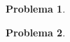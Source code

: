 \documentclass[12pt]{article}
\title{
    \textbf{\homeworknumber: \subject}\\
    \normalsize\vspace{0.1in}\small{\textbf{Entrega}:~\today}
    \vspace{-1.5in}
}
\author{}
\date{}
\theoremstyle{break}
\newtheorem{exercise}{Problema}
\begin{document}
    \maketitle
    \thispagestyle{fancy}
    
    
    \begin{exercise}
        \kant[1]
    \end{exercise}

    \begin{exercise}
        \kant[1]
    \end{exercise}
\end{document}
